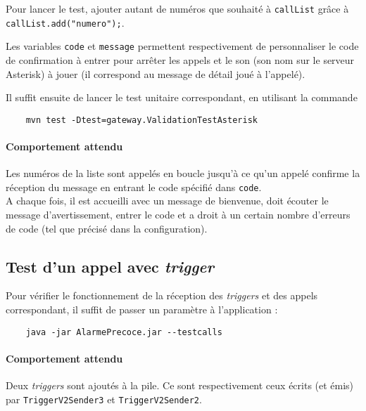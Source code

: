 \documentclass{article}
\begin{document}
Pour lancer le test, ajouter autant de numéros que souhaité à \texttt{callList} grâce à \texttt{callList.add("numero");}.

Les variables \texttt{code} et \texttt{message} permettent respectivement de personnaliser le code de confirmation à entrer pour arrêter les appels et le son (son nom sur le serveur Asterisk) à jouer (il correspond au message de détail joué à l'appelé).

Il suffit ensuite de lancer le test unitaire correspondant, en utilisant la commande 

\begin{lstlisting}
    mvn test -Dtest=gateway.ValidationTestAsterisk
\end{lstlisting}

\paragraph{Comportement attendu\\}

Les numéros de la liste sont appelés en boucle jusqu'à ce qu'un appelé confirme la réception du message en entrant le code spécifié dans \texttt{code}. \\
A chaque fois, il est accueilli avec un message de bienvenue, doit écouter le message d'avertissement, entrer le code et a droit à un certain nombre d'erreurs de code (tel que précisé dans la configuration).

\subsection{Test d'un appel avec \emph{trigger}}

Pour vérifier le fonctionnement de la réception des \emph{triggers} et des appels correspondant, il suffit de passer un paramètre à l'application :

\begin{lstlisting}
    java -jar AlarmePrecoce.jar --testcalls
\end{lstlisting}

\paragraph{Comportement attendu\\}

Deux \emph{triggers} sont ajoutés à la pile. Ce sont respectivement ceux écrits (et émis) par \texttt{TriggerV2Sender3} et \texttt{TriggerV2Sender2}.
\end{document}
